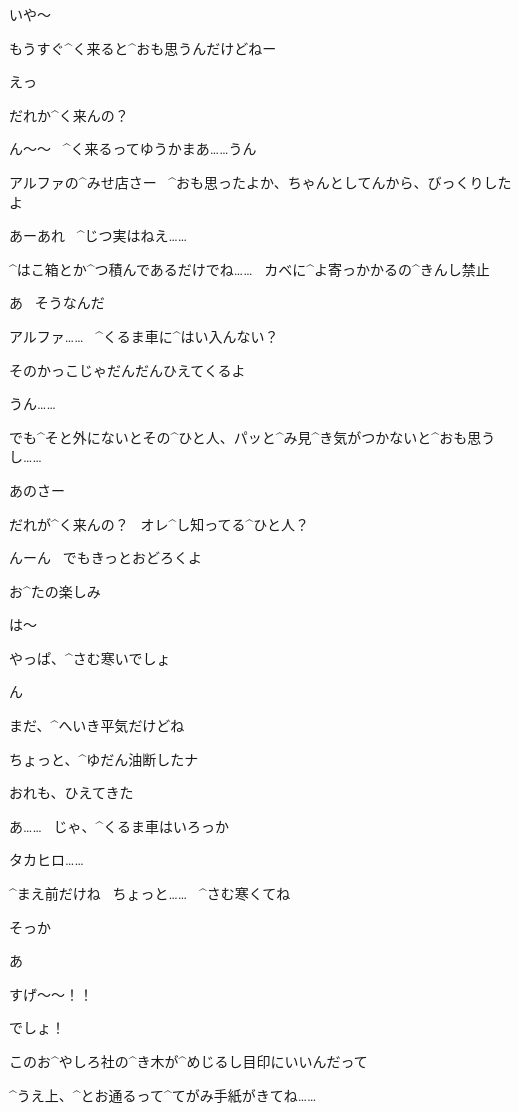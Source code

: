 \Alpha いや〜

\Alpha もうすぐ^{く}{来}ると^{おも}{思}うんだけどねー

\Takahiro えっ

\Takahiro だれか^{く}{来}んの？

\Alpha ん〜〜
\ ^{く}{来}るってゆうかまあ……うん

\page[25]
\Takahiro アルファの^{みせ}{店}さー
\ ^{おも}{思}ったよか、ちゃんとしてんから、びっくりしたよ

\Alpha あーあれ
\ ^{じつ}{実}はねえ……

\Alpha ^{はこ}{箱}とか^{つ}{積}んであるだけでね……
\ カベに^{よ}{寄}っかかるの^{きんし}{禁止}

\Takahiro あ
\ そうなんだ

\page[26]
\Takahiro アルファ……
\ ^{くるま}{車}に^{はい}{入}んない？

\Takahiro そのかっこじゃだんだんひえてくるよ

\Alpha うん……

\Alpha でも^{そと}{外}にないとその^{ひと}{人}、パッと^{み}{見}^{き}{気}がつかないと^{おも}{思}うし……

\Takahiro あのさー

\Takahiro だれが^{く}{来}んの？
\ オレ^{し}{知}ってる^{ひと}{人}？

\Alpha んーん
\ でもきっとおどろくよ

\Alpha お^{たの}{楽}しみ

\page[27]
\Alpha は〜

\Takahiro やっぱ、^{さむ}{寒}いでしょ

\Alpha ん

\Alpha まだ、^{へいき}{平気}だけどね

\Alpha ちょっと、^{ゆだん}{油断}したナ

\Takahiro おれも、ひえてきた

\Alpha あ……
\ じゃ、^{くるま}{車}はいろっか

\page[28]
\Alpha タカヒロ……

\page[29]
\Takahiro ^{まえ}{前}だけね
\ ちょっと……
\ ^{さむ}{寒}くてね

\Alpha そっか

\page[30]
\Alpha あ

\page[32]
\Takahiro すげ〜〜！！

\Alpha でしょ！

\page[33]
\Alpha このお^{やしろ}{社}の^{き}{木}が^{めじるし}{目印}にいいんだって

\Alpha ^{うえ}{上}、^{とお}{通}るって^{てがみ}{手紙}がきてね……

